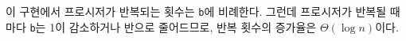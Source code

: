 
이 구현에서 프로시저가 반복되는 횟수는 \texttt{b}에 비례한다. 그런데
프로시저가 반복될 때마다 \texttt{b}는 1이 감소하거나 반으로 줄어드므로, 반복
횟수의 증가율은 $\Theta(\log n)$이다.






